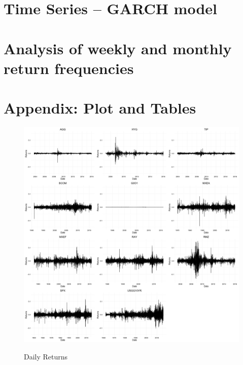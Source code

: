 \documentclass[12pt]{article}
\begin{document}

\clearpage

\section{Time Series -- GARCH model}%


\clearpage

\section{Analysis of weekly and monthly return frequencies}%



\clearpage

\section{Appendix: Plot and Tables}%

\begin{figure}[h]
\caption{Daily Returns} 
\centering 
\includegraphics[width=15cm]{../figures/summary_daily/returns}
\label{fig: dailyReturns}
\end{figure}
\end{document}
